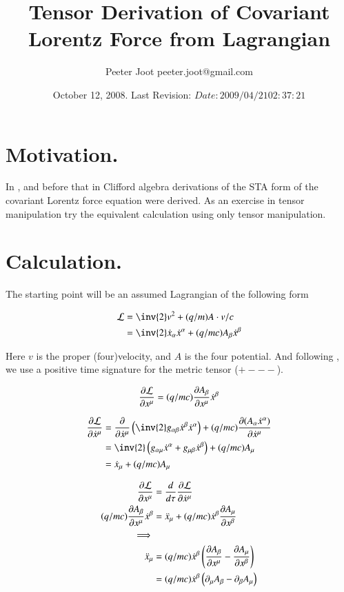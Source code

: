 \documentclass{article}
\title{Tensor Derivation of Covariant Lorentz Force from Lagrangian}
\author{Peeter Joot \quad peeter.joot@gmail.com}
\date{ October 12, 2008.  Last Revision: $Date: 2009/04/21 02:37:21 $ }
\begin{document}
\maketitle{}
\tableofcontents
\section{ Motivation. }

In \cite{PJSrLorentzForce}, and before that in \cite{PJSrLagrangian} Clifford
algebra derivations of the STA form of the covariant Lorentz force equation
were derived.  As an exercise in tensor manipulation try the equivalent
calculation using only tensor manipulation.

\section{ Calculation. }

The starting point will be an assumed Lagrangian of the following form

\begin{align}\label{eqn:lagrangian}
\LL &= \inv{2} v^2 + (q/m) A \cdot v/c \\
&= \inv{2} \xdot_\alpha \xdot^\alpha + (q/mc) A_\beta \xdot^\beta
\end{align}

Here $v$ is the proper (four)velocity, and $A$ is the four potential.
And following \cite{doran2003gap}, we use a positive time signature for the metric tensor ($+---$).

\begin{align*}
\PD{x^\mu}{\LL} = (q/mc) \PD{x^\mu}{A_\beta} \xdot^\beta
\end{align*}

\begin{align*}
\PD{\xdot^\mu}{\LL}
&= \PD{\xdot^\mu}{} \left( \inv{2} g_{\alpha\beta} \xdot^\beta \xdot^\alpha \right) + (q/mc) \PD{\xdot^\mu}{(A_\alpha \xdot^\alpha)} \\
&= \inv{2} \left( g_{\alpha\mu} \xdot^\alpha +g_{\mu\beta} \xdot^\beta \right) + (q/mc) A_\mu \\
&= \xdot_\mu + (q/mc) A_\mu \\
\end{align*}

\begin{align*}
\PD{x^\mu}{\LL} &= \frac{d}{d\tau} \PD{\xdot^\mu}{\LL} \\
(q/mc) \PD{x^\mu}{A_\beta} \xdot^\beta &= \xddot_\mu + (q/mc) \xdot^\beta \PD{x^\beta}{A_\mu} \\
\implies \\
\xddot_\mu
&= (q/mc) \xdot^\beta \left( \PD{x^\mu}{A_\beta} - \PD{x^\beta}{A_\mu} \right) \\
&= (q/mc) \xdot^\beta \left( \partial_\mu {A_\beta} - \partial_{\beta}{A_\mu} \right) \\
\end{align*}
\end{document}
